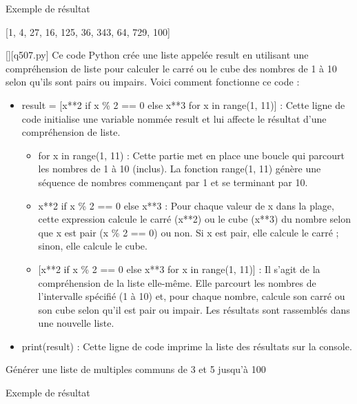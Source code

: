 Exemple de résultat

[1, 4, 27, 16, 125, 36, 343, 64, 729, 100]
        \par
        \begin{solution}
            \renewcommand{\nomfichier}{q507.py}
            \pythonfile{\chemincode \nomfichier}[][\nomfichier]
            Ce code Python crée une liste appelée result en utilisant une compréhension de liste pour calculer le carré ou le cube des nombres de 1 à 10 selon qu'ils sont pairs ou impairs. Voici comment fonctionne ce code :\par

\begin{itemize}
\item     result = [x**2 if x \% 2 == 0 else x**3 for x in range(1, 11)] : Cette ligne de code initialise une variable nommée result et lui affecte le résultat d'une compréhension de liste.

\begin{itemize}
\item         for x in range(1, 11) : Cette partie met en place une boucle qui parcourt les nombres de 1 à 10 (inclus). La fonction range(1, 11) génère une séquence de nombres commençant par 1 et se terminant par 10.
\item         x**2 if x \% 2 == 0 else x**3 : Pour chaque valeur de x dans la plage, cette expression calcule le carré (x**2) ou le cube (x**3) du nombre selon que x est pair (x \% 2 == 0) ou non. Si x est pair, elle calcule le carré ; sinon, elle calcule le cube.
\item{}         [x**2 if x \% 2 == 0 else x**3 for x in range(1, 11)] : Il s'agit de la compréhension de la liste elle-même. Elle parcourt les nombres de l'intervalle spécifié (1 à 10) et, pour chaque nombre, calcule son carré ou son cube selon qu'il est pair ou impair. Les résultats sont rassemblés dans une nouvelle liste.
\end{itemize}
\item    print(result) : Cette ligne de code imprime la liste des résultats sur la console.
\end{itemize}
        \end{solution}
        

        \question
        Générer une liste de multiples communs de 3 et 5 jusqu'à 100

Exemple de résultat

